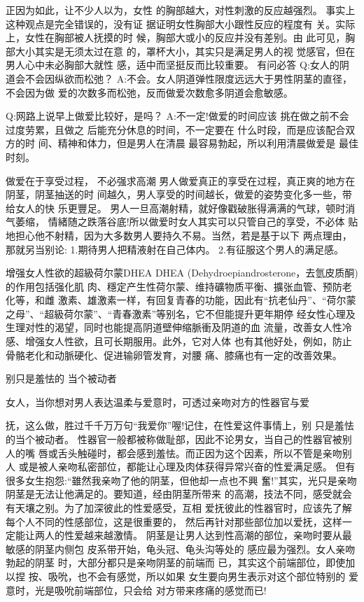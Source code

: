 \documentclass[12pt,UTF8]{ctexbook}
\begin{document}
正因为如此，让不少人以为，女性
的胸部越大，对性刺激的反应越强烈。
事实上这种观点是完全错误的，没有证
据证明女性胸部大小跟性反应的程度有
关。实际上，女性在胸部被人抚摸的时
候，胸部大或小的反应并没有差别。由
此可见，胸部大小其实是无须太过在意
的，罩杯大小，其实只是满足男人的视
觉感官，但在男人心中未必胸部大就性
感，适中而坚挺反而比较重要。
有问必答
Q:女人的阴道会不会因纵欲而松弛？
A:不会。女人阴道弹性限度远远大于男性阴茎的直径，不会因为做
爱的次数多而松弛，反而做爱次数愈多阴道会愈敏感。

Q:网路上说早上做爱比较好，是吗？
A:不一定!做爱的时间应该
挑在做之前不会过度劳累，且做之
后能充分休息的时间，不一定要在
什么时段，而是应该配合双方的时
间、精神和体力，但是男人在清晨
最容易勃起，所以利用清晨做爱是
最佳时刻。

做爱在于享受过程，
不必强求高潮
男人做爱真正的享受在过程，真正爽的地方在阴茎，阴茎抽送的时
间越久，男人享受的时间越长，做爱的姿势变化多一些，带给女人的快
乐更豐足。
男人一旦高潮射精，就好像戳破胀得满满的气球，顿时消气萎缩，
情緒随之跌落谷底!所以做爱时女人其实可以只管自己的享受，不必体
贴地担心他不射精，因为大多数男人要持久不易。当然，若是基于以下
两点理由，那就另当别论:
1.期待男人把精液射在自己体内。
2.有征服这个男人的满足感。

增强女人性欲的超級荷尔蒙DHEA
DHEA (Dehydroepiandrosterone，去氫皮质酮)的作用包括强化肌
肉、穩定产生性荷尔蒙、维持礦物质平衡、擴张血管、预防老化等，和雌
激素、雄激素一样，有回复青春的功能，因此有“抗老仙丹”、“荷尔蒙
之母”、“超級荷尔蒙”、“青春激素”等别名，它不但能提升更年期停
经女性心理及生理对性的渴望，同时也能提高阴道壁伸缩脈衝及阴道的血
流量，改善女人性冷感、增强女人性欲，且可长期服用。此外，它对人体
也有其他好处，例如，防止骨骼老化和动脈硬化、促进输卵管发育，对腰
痛、膝痛也有一定的改善效果。

别只是羞怯的
当个被动者

女人，当你想对男人表达温柔与爱意时，可透过亲吻对方的性器官与爱

抚，这么做，胜过千千万万句“我爱你”喔!记住，在性爱这件事情上，别
只是羞怯的当个被动者。
性器官一般都被称做耻部，因此不论男女，当自己的性器官被别人的嘴
唇或舌头触碰时，都会感到羞怯。而正因为这个因素，所以不管是亲吻别人
或是被人亲吻私密部位，都能让心理及肉体获得异常兴奋的性爱满足感。
但有很多女生抱怨:“雖然我亲吻了他的阴茎，但他却一点也不興
奮!”其实，光只是亲吻阴茎是无法让他满足的。要知道，经由阴茎所带来
的高潮，技法不同，感受就会有天壤之别。为了加深彼此的性爱感受，互相
爱抚彼此的性器官时，应该先了解每个人不同的性感部位，这是很重要的，
然后再针对那些部位加以爱抚，这样一定能让两人的性爱越来越激情。
阴茎是让男人达到性高潮的部位，亲吻时要从最敏感的阴茎内侧包
皮系带开始，龟头冠、龟头沟等处的
感应最为强烈。女人亲吻勃起的阴茎
时，大部分都只是亲吻阴茎的前端而
已，其实这个前端部位，即使加以捏
按、吸吮，也不会有感觉，所以如果
女生要向男生表示对这个部位特别的
爱意时，光是吸吮前端部位，只会给
对方带来疼痛的感觉而已!
\end{document}
